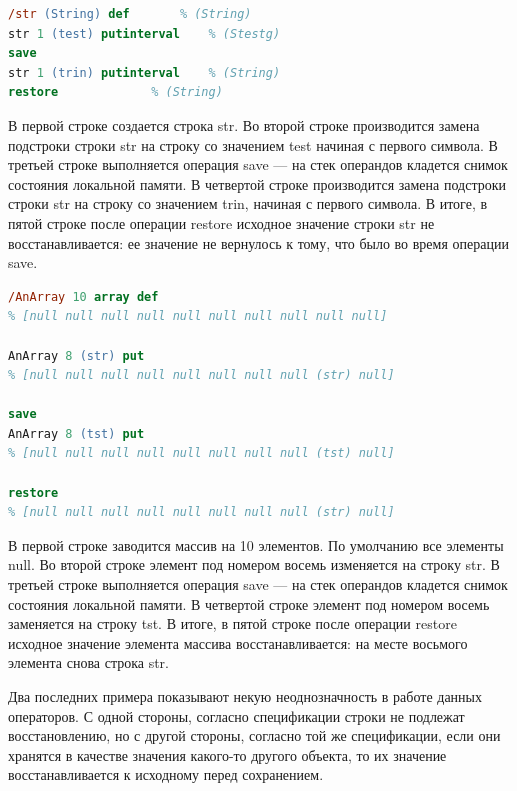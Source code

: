 \begin{lstlisting}[label=PostScript-example1,caption=Изменение значения строки, language = PostScript]
/str (String) def 		% (String)
str 1 (test) putinterval	% (Stestg)
save
str 1 (trin) putinterval	% (String)
restore				% (String)
\end{lstlisting}


В первой строке создается строка str. Во второй строке производится замена подстроки строки str на строку со значением test начиная с первого символа.  В третьей строке выполняется операция save --- на стек операндов кладется снимок состояния локальной памяти. В четвертой строке производится замена подстроки строки str на строку со значением trin, начиная с первого символа. В итоге, в пятой строке после операции restore исходное значение строки str не восстанавливается: ее значение не вернулось к тому, что было во время операции save. 


\begin{lstlisting}[label=PostScript-example2,caption=Изменение значения массива, language = PostScript]
/AnArray 10 array def 
% [null null null null null null null null null null]

AnArray 8 (str) put   
% [null null null null null null null null (str) null]

save
AnArray 8 (tst) put   
% [null null null null null null null null (tst) null]

restore		      
% [null null null null null null null null (str) null]
\end{lstlisting}


В первой строке заводится массив на 10 элементов. По умолчанию все элементы null. Во второй строке элемент под номером восемь изменяется на строку str.  В третьей строке выполняется операция save --- на стек операндов кладется снимок состояния локальной памяти. В четвертой строке элемент под номером восемь заменяется на строку tst. В итоге, в пятой строке после операции restore исходное значение элемента массива восстанавливается: на месте восьмого элемента снова строка str. 

Два последних примера показывают некую неоднозначность в работе данных операторов. С одной стороны, согласно спецификации строки не подлежат восстановлению, но с другой стороны, согласно той же спецификации, если они хранятся в качестве значения какого-то другого объекта, то их значение восстанавливается к исходному перед сохранением.

